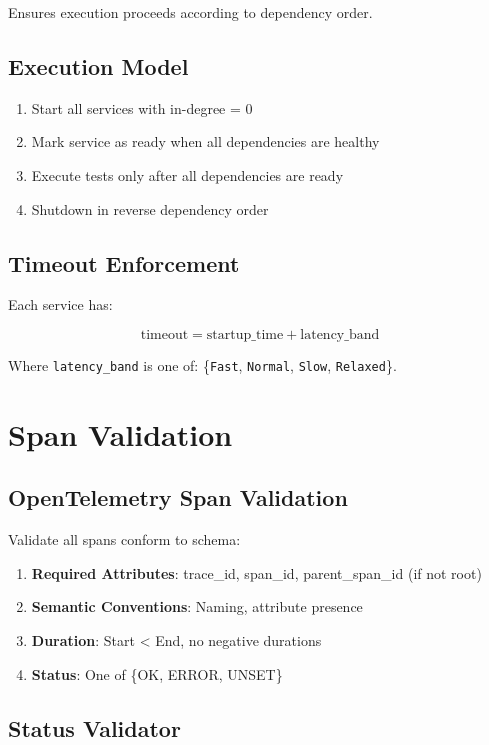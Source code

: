 \documentclass[12pt,twoside,openright]{book}
\theoremstyle{plain}
\theoremstyle{definition}
\theoremstyle{remark}
\begin{document}
Ensures execution proceeds according to dependency order.

\subsection{Execution Model}

\begin{enumerate}
  \item Start all services with in-degree = 0
  \item Mark service as ready when all dependencies are healthy
  \item Execute tests only after all dependencies are ready
  \item Shutdown in reverse dependency order
\end{enumerate}

\subsection{Timeout Enforcement}

Each service has:

$$\text{timeout} = \text{startup\_time} + \text{latency\_band}$$

Where \texttt{latency\_band} is one of: \{\texttt{Fast}, \texttt{Normal}, \texttt{Slow}, \texttt{Relaxed}\}.

\section{Span Validation}

\subsection{OpenTelemetry Span Validation}

Validate all spans conform to schema:

\begin{enumerate}
  \item \textbf{Required Attributes}: trace\_id, span\_id, parent\_span\_id (if not root)
  \item \textbf{Semantic Conventions}: Naming, attribute presence
  \item \textbf{Duration}: Start < End, no negative durations
  \item \textbf{Status}: One of \{OK, ERROR, UNSET\}
\end{enumerate}

\subsection{Status Validator}
\end{document}

